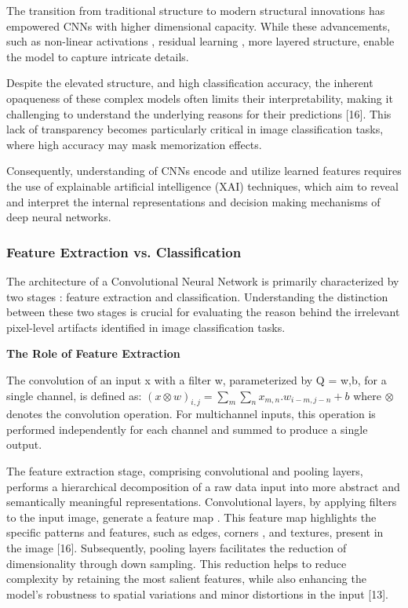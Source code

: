 The transition from traditional structure to modern structural innovations has empowered CNNs with higher dimensional capacity. While these advancements, such as non-linear activations , residual learning , more layered structure, enable the model to capture intricate details. 

Despite the elevated structure, and high classification accuracy, the inherent opaqueness of these complex models often limits their interpretability, making it challenging to understand the underlying reasons for their predictions [16]\cite{10.1145/3563691}. This lack of transparency becomes particularly critical in image classification tasks, where high accuracy may mask memorization effects.  

Consequently, understanding of CNNs encode and utilize learned features requires the use of explainable artificial intelligence (XAI) techniques, which aim to reveal and interpret the internal representations and decision making mechanisms of deep neural networks.

\subsubsection{ Feature Extraction vs. Classification}

The architecture of a Convolutional Neural Network is primarily characterized by two stages : feature extraction and classification. Understanding the distinction between these two stages is crucial for evaluating the reason behind the irrelevant pixel-level artifacts identified in image classification tasks.

\textbf{The Role of Feature Extraction}


\begin{theorem}
\label{Convolutional Operation}
The convolution of an input x with a filter w, parameterized by Q = {w,b}, for a single channel, is defined as:
    \((x\otimes w)_{i,j}=\sum_{m}\sum_{n}x_{m,n}.w_{i-m,j-n}+b\)
where \(\otimes\)  denotes the convolution operation. For multichannel inputs, this operation is performed independently for each channel and summed to produce a single output.
\end{theorem}



The feature extraction stage, comprising convolutional and pooling layers, performs a hierarchical decomposition of a raw data input into more abstract and semantically meaningful representations. Convolutional layers, by applying filters to the input image, generate a feature map . This feature map highlights the specific patterns and features, such as edges, corners , and textures, present in the image [16]\cite{Fauzan2021PleuralEC}. Subsequently, pooling layers facilitates the reduction of dimensionality through down sampling. This reduction helps to reduce complexity by retaining the most salient features, while also enhancing the model's robustness to spatial variations and minor distortions in the input [13]\cite{fel2025sparksexplainabilityrecentadvancements}. 

